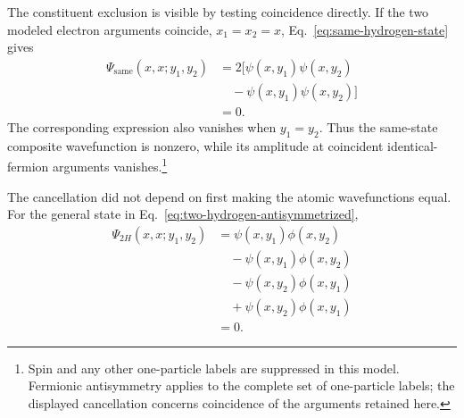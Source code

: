 The constituent exclusion is visible by testing coincidence directly. If the two modeled electron arguments coincide, \(x_1=x_2=x\), Eq.~\eqref{eq:same-hydrogen-state} gives
\begin{align}
\Psi_{\mathrm{same}}(x,x;y_1,y_2)
&=2\bigl[
\psi(x,y_1)\psi(x,y_2)\nonumber\\
&\quad{}-\psi(x,y_1)\psi(x,y_2)
\bigr]\\
&=0.
\end{align}
The corresponding expression also vanishes when \(y_1=y_2\). Thus the same-state composite wavefunction is nonzero, while its amplitude at coincident identical-fermion arguments vanishes.\footnote{Spin and any other one-particle labels are suppressed in this model. Fermionic antisymmetry applies to the complete set of one-particle labels; the displayed cancellation concerns coincidence of the arguments retained here.}

\begin{classroomqa}
\end{classroomqa}

\begin{classroomqa}
\end{classroomqa}

The cancellation did not depend on first making the atomic wavefunctions equal. For the general state in Eq.~\eqref{eq:two-hydrogen-antisymmetrized},
\begin{align}
\Psi_{2H}(x,x;y_1,y_2)
&=\psi(x,y_1)\phi(x,y_2)\nonumber\\
&\quad{}-\psi(x,y_1)\phi(x,y_2)\nonumber\\
&\quad{}-\psi(x,y_2)\phi(x,y_1)\nonumber\\
&\quad{}+\psi(x,y_2)\phi(x,y_1)\\
&=0.
\end{align}

